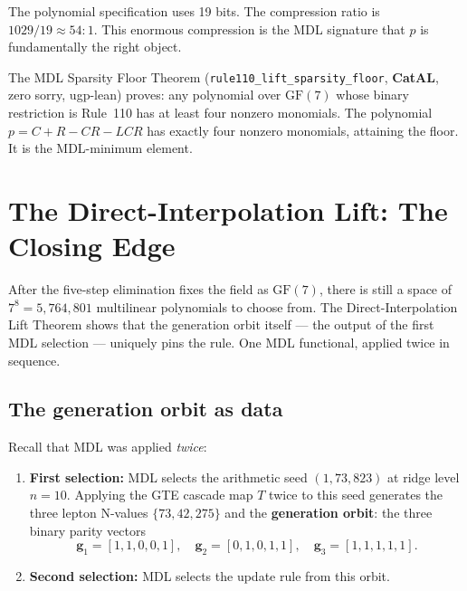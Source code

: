 \documentclass[11pt,a4paper]{article}
\newcommand{\term}[1]{\textbf{#1}}
\newcommand{\lean}[1]{\texttt{#1}}
\newcommand{\CatAL}{\textbf{CatAL}}
\theoremstyle{definition}
\begin{document}
The polynomial specification uses 19 bits.  The compression ratio is
$1029 / 19 \approx 54:1$.  This enormous compression is the MDL
signature that $p$ is fundamentally the right object.

\begin{tcolorbox}[colback=boxblue,colframe=blue!40!black,
  title={Machine certification of 19-bit uniqueness}]
The MDL Sparsity Floor Theorem
(\lean{rule110\_lift\_sparsity\_floor}, \CatAL, zero sorry, ugp-lean)
proves: any polynomial over $\mathrm{GF}(7)$ whose binary restriction is
Rule~110 has at least four nonzero monomials.  The polynomial $p = C+R-CR-LCR$
has exactly four nonzero monomials, attaining the floor.  It is the
MDL-minimum element.
\end{tcolorbox}

\section{The Direct-Interpolation Lift: The Closing Edge}
\label{sec:lift}

\begin{tcolorbox}[colback=boxgreen,colframe=green!50!black,
  title={A second, independent route}]
After the five-step elimination fixes the field as $\mathrm{GF}(7)$, there
is still a space of $7^8 = 5{,}764{,}801$ multilinear polynomials to choose
from.  The Direct-Interpolation Lift Theorem shows that the generation
orbit itself — the output of the first MDL selection — uniquely pins the
rule.  One MDL functional, applied twice in sequence.
\end{tcolorbox}

\subsection{The generation orbit as data}

Recall that MDL was applied \emph{twice}:

\begin{enumerate}
  \item \textbf{First selection:} MDL selects the arithmetic seed $(1, 73, 823)$
    at ridge level $n = 10$.  Applying the GTE cascade map $T$ twice to this
    seed generates the three lepton N-values $\{73, 42, 275\}$ and the
    \term{generation orbit}: the three binary parity vectors
    \[
      \mathbf{g}_1 = [1,1,0,0,1], \quad
      \mathbf{g}_2 = [0,1,0,1,1], \quad
      \mathbf{g}_3 = [1,1,1,1,1].
    \]
  \item \textbf{Second selection:} MDL selects the update rule from this orbit.
\end{enumerate}
\end{document}
